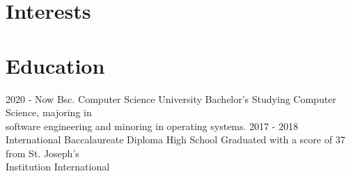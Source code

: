 \documentclass[]{jvcv}
\begin{document}
\newpage

%
\section{Interests}

%
\vspace{0.5cm}
\section{Education}

\begin{edulist}
	\eduentry
		{2020 - Now}
		{Bsc. Computer Science}
		{University Bachelor's}
		{Studying Computer Science, majoring in\\
		software engineering and minoring in operating systems.}
	\eduentry
		{2017 - 2018}
		{International Baccalaureate Diploma}
		{High School}
		{Graduated with a score of 37 from St. Joseph's\\
		Institution International}
\end{edulist}
\end{document}
